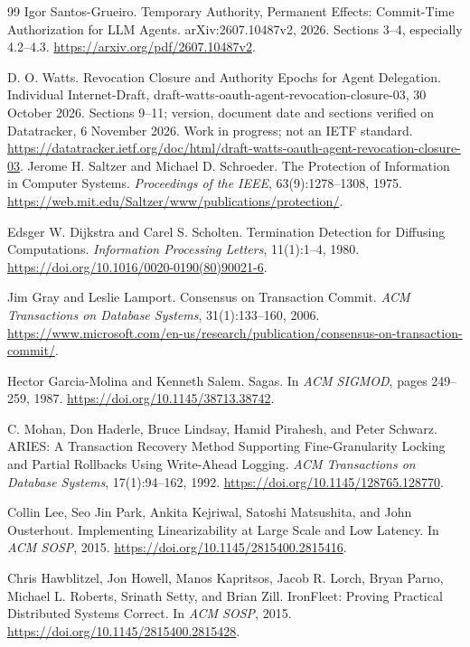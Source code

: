 \begin{thebibliography}{99}
Igor Santos-Grueiro.
Temporary Authority, Permanent Effects: Commit-Time Authorization for LLM Agents.
arXiv:2607.10487v2, 2026. Sections 3--4, especially 4.2--4.3.
\url{https://arxiv.org/pdf/2607.10487v2}.

D. O. Watts.
Revocation Closure and Authority Epochs for Agent Delegation.
Individual Internet-Draft, draft-watts-oauth-agent-revocation-closure-03,
30 October 2026. Sections 9--11; version, document date and sections verified
on Datatracker, 6 November 2026. Work in progress; not an IETF standard.
\url{https://datatracker.ietf.org/doc/html/draft-watts-oauth-agent-revocation-closure-03}.
Jerome H. Saltzer and Michael D. Schroeder.
The Protection of Information in Computer Systems.
\emph{Proceedings of the IEEE}, 63(9):1278--1308, 1975.
\url{https://web.mit.edu/Saltzer/www/publications/protection/}.

Edsger W. Dijkstra and Carel S. Scholten.
Termination Detection for Diffusing Computations.
\emph{Information Processing Letters}, 11(1):1--4, 1980.
\url{https://doi.org/10.1016/0020-0190(80)90021-6}.

Jim Gray and Leslie Lamport.
Consensus on Transaction Commit.
\emph{ACM Transactions on Database Systems}, 31(1):133--160, 2006.
\url{https://www.microsoft.com/en-us/research/publication/consensus-on-transaction-commit/}.

Hector Garcia-Molina and Kenneth Salem.
Sagas. In \emph{ACM SIGMOD}, pages 249--259, 1987.
\url{https://doi.org/10.1145/38713.38742}.

C. Mohan, Don Haderle, Bruce Lindsay, Hamid Pirahesh, and Peter Schwarz.
ARIES: A Transaction Recovery Method Supporting Fine-Granularity Locking and
Partial Rollbacks Using Write-Ahead Logging.
\emph{ACM Transactions on Database Systems}, 17(1):94--162, 1992.
\url{https://doi.org/10.1145/128765.128770}.

Collin Lee, Seo Jin Park, Ankita Kejriwal, Satoshi Matsushita, and John Ousterhout.
Implementing Linearizability at Large Scale and Low Latency.
In \emph{ACM SOSP}, 2015.
\url{https://doi.org/10.1145/2815400.2815416}.

Chris Hawblitzel, Jon Howell, Manos Kapritsos, Jacob R. Lorch, Bryan Parno,
Michael L. Roberts, Srinath Setty, and Brian Zill.
IronFleet: Proving Practical Distributed Systems Correct.
In \emph{ACM SOSP}, 2015.
\url{https://doi.org/10.1145/2815400.2815428}.


\end{thebibliography}
